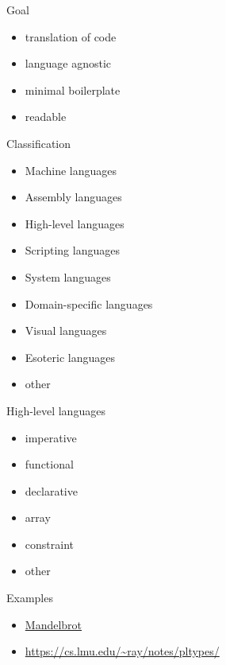 \documentclass[aspectratio=169, handout]{beamer}
\begin{document}
    \begin{frame}{Goal}
    \begin{itemize}
        \item translation of code \pause
        \item language agnostic \pause
        \item minimal boilerplate \pause
        \item readable
    \end{itemize}
    \end{frame}
    
    \begin{frame}{Classification}
    \begin{itemize}
        \item {\color<2>{gray}Machine languages}
        \item {Assembly languages}
        \item High-level languages
        \item Scripting languages
        \item System languages
        \item Domain-specific languages
        \item {\color<2>{gray}Visual languages}
        \item {Esoteric languages}
        \item {other}
    \end{itemize}
    \end{frame}
    
    \begin{frame}{High-level languages}
    \begin{itemize}
        \item imperative
        \item functional
        \item {\color<2>{gray}declarative}
        \item {array}
        \item constraint
        \item {other}
    \end{itemize}
   
    \end{frame}
    
    \begin{frame}{Examples}
     \begin{itemize}
         \item \href{https://rosettacode.org/wiki/Mandelbrot_set}{Mandelbrot}
         \item \url{https://cs.lmu.edu/~ray/notes/pltypes/}
     \end{itemize}
    \end{frame}
    
\end{document}

